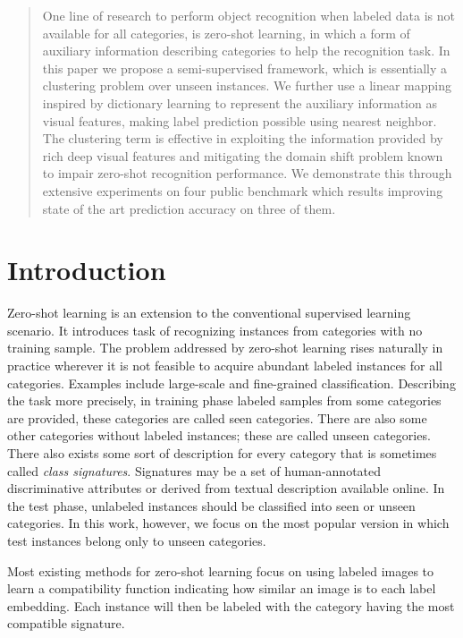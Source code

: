 
\begin{abstract}
One line of research to perform object recognition when labeled data is not available for all categories, is zero-shot learning,
in which a form of auxiliary information describing categories to help the recognition task.
In this paper we propose a semi-supervised framework, which is essentially a clustering problem over unseen instances. We further
use a linear mapping inspired by dictionary learning to represent the auxiliary information as visual features, making label prediction
possible using nearest neighbor. The clustering term is effective in exploiting the information provided by rich deep visual features and
mitigating the domain shift problem known to impair zero-shot recognition performance. We demonstrate this through extensive
experiments on four public benchmark which results improving state of the art prediction accuracy on three of them.
\end{abstract}


\section{Introduction}
Zero-shot learning is an extension to the conventional supervised learning scenario.
It introduces task of recognizing instances from categories with no training sample.
 The problem addressed by zero-shot learning rises naturally in practice wherever it is not feasible to acquire abundant labeled instances
 for all categories. Examples include large-scale and fine-grained classification.
Describing the task more precisely, in training phase labeled samples from some categories are provided,
these categories are called seen categories. There are also some other categories without labeled instances; these are called unseen categories.
There also exists some sort of description for every category that is sometimes called \textit{class signatures}.
Signatures may be a set of human-annotated discriminative attributes or derived from textual description available online.
In the test phase, unlabeled instances should be classified into seen or unseen categories. In this work, however, we focus on the most popular version
in which test instances belong only to unseen categories.

Most existing methods for zero-shot learning focus on using labeled images to learn a compatibility function indicating how similar an image is
to each label embedding. Each instance will then be labeled with the category having the most compatible signature.

